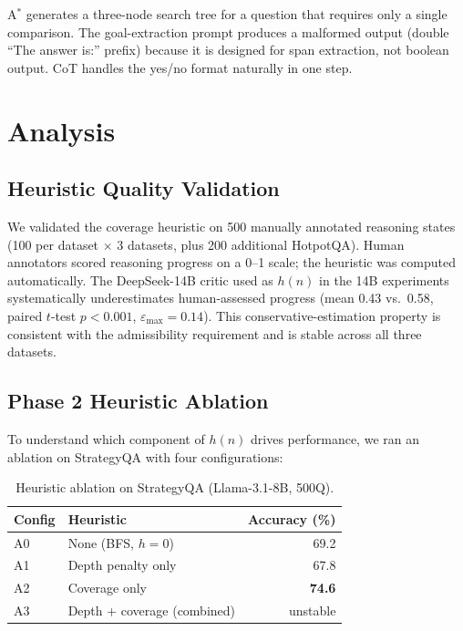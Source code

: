 \documentclass{article}
\newcommand{\astar}{A$^*$\xspace}
\begin{document}
\astar generates a three-node search tree for a question that requires only a single comparison. The goal-extraction prompt produces a malformed output (double ``The answer is:'' prefix) because it is designed for span extraction, not boolean output. CoT handles the yes/no format naturally in one step.

\section{Analysis}
\label{sec:analysis}

\subsection{Heuristic Quality Validation}
\label{sec:heuristic_val}

We validated the coverage heuristic on 500 manually annotated reasoning states (100 per dataset $\times$ 3 datasets, plus 200 additional HotpotQA). Human annotators scored reasoning progress on a 0--1 scale; the heuristic was computed automatically. The DeepSeek-14B critic used as $h(n)$ in the 14B experiments systematically underestimates human-assessed progress (mean 0.43 vs.\ 0.58, paired $t$-test $p < 0.001$, $\varepsilon_{\max} = 0.14$). This conservative-estimation property is consistent with the admissibility requirement and is stable across all three datasets.

\subsection{Phase 2 Heuristic Ablation}
\label{sec:heuristic_ablation}

To understand which component of $h(n)$ drives performance, we ran an ablation on StrategyQA with four configurations:

\begin{table}[h]
\centering
\caption{Heuristic ablation on StrategyQA (Llama-3.1-8B, 500Q).}
\label{tab:ablation}
\begin{tabular}{llr}
\toprule
Config & Heuristic & Accuracy (\%) \\
\midrule
A0 & None (BFS, $h=0$)         & 69.2 \\
A1 & Depth penalty only        & 67.8 \\
A2 & Coverage only             & \textbf{74.6} \\
A3 & Depth + coverage (combined) & unstable \\
\bottomrule
\end{tabular}
\end{table}
\end{document}
